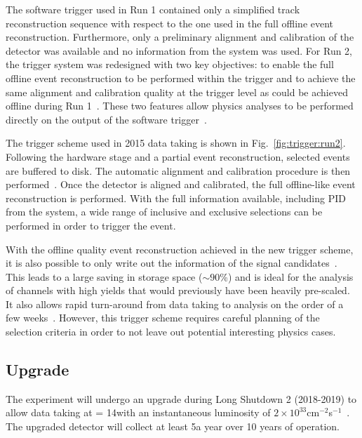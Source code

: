 The software trigger used in Run 1 contained only a simplified track reconstruction sequence with respect to the one used in the full offline event reconstruction. Furthermore, only a preliminary alignment and calibration of the detector was available and no information from the \rich system was used. For Run 2, the trigger system was redesigned with two key objectives: to enable the full offline event reconstruction to be performed within the trigger and to achieve the same alignment and calibration quality at the trigger level as could be achieved offline during Run 1~\cite{hlt-run2}. These two features allow physics analyses to be performed directly on the output of the software trigger~\cite{turbo}.

The trigger scheme used in 2015 data taking is shown in Fig.~\ref{fig:trigger:run2}. Following the hardware stage and a partial event reconstruction, selected events are buffered to disk. The automatic alignment and calibration procedure is then performed~\cite{alignment}. Once the detector is aligned and calibrated, the full offline-like event reconstruction is performed. With the full information available, including PID from the \rich system, a wide range of inclusive and exclusive selections can be performed in order to trigger the event.

 With the offline quality event reconstruction achieved in the new trigger scheme, it is also possible to only write out the information of the signal candidates~\cite{turbo}. This leads to a large saving in storage space ($\sim 90$\%) and is ideal for the analysis of channels with high yields that would previously have been heavily pre-scaled. It also allows rapid turn-around from data taking to analysis on the order of a few weeks~\cite{LHCb-PAPER-2015-037,LHCb-PAPER-2015-041}. However, this trigger scheme requires careful planning of the selection criteria in order to not leave out potential interesting physics cases.

\subsection{\lhcb Upgrade}
\label{sec:lhcb:lhcb-upgrade}

The \lhcb experiment will undergo an upgrade during Long Shutdown 2 (2018-2019) to allow data taking at \sqs = 14\tev with an instantaneous luminosity of $2\times10^{33}$cm$^{-2}$s$^{-1}$~\cite{upgrade-loi,LHCb-TDR-012}. The upgraded detector will collect at least 5\invfb a year over 10 years of operation.

